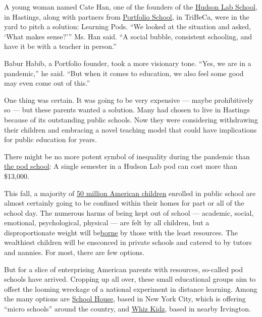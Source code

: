A young woman named Cate Han, one of the founders of the
\href{https://www.hudsonlabschool.com/}{Hudson Lab School}, in Hastings,
along with partners from
\href{https://www.portfolio-school.com/}{Portfolio School}, in TriBeCa,
were in the yard to pitch a solution: Learning Pods. ``We looked at the
situation and asked, `What makes sense?''' Ms. Han said. ``A social
bubble, consistent schooling, and have it be with a teacher in person.''

Babur Habib, a Portfolio founder, took a more visionary tone. ``Yes, we
are in a pandemic,'' he said. ``But when it comes to education, we also
feel some good may even come out of this.''

One thing was certain. It was going to be very expensive --- maybe
prohibitively so --- but these parents wanted a solution. Many had
chosen to live in Hastings because of its outstanding public schools.
Now they were considering withdrawing their children and embracing a
novel teaching model that could have implications for public education
for years.

There might be no more potent symbol of inequality during the pandemic
than
\href{https://www.nytimes3xbfgragh.onion/2020/07/22/parenting/school-pods-coronavirus.html}{the
pod school}: A single semester in a Hudson Lab pod can cost more than
\$13,000.

This fall, a majority of
\href{https://nces.ed.gov/programs/digest/d18/tables/dt18_203.10.asp}{50
million American children} enrolled in public school are almost
certainly going to be confined within their homes for part or all of the
school day. The numerous harms of being kept out of school --- academic,
social, emotional, psychological, physical --- are felt by all children,
but a disproportionate weight will
be\href{https://www.nytimes3xbfgragh.onion/2020/06/05/us/coronavirus-education-lost-learning.html}{borne}
by those with the least resources. The wealthiest children will be
ensconced in private schools and catered to by tutors and nannies. For
most, there are few options.

But for a slice of enterprising American parents with resources,
so-called pod schools have arrived. Cropping up all over, these small
educational groups aim to offset the looming wreckage of a national
experiment in distance learning. Among the many options are
\href{https://www.getschoolhouse.com/}{School House}, based in New York
City, which is offering ``micro schools'' around the country, and
\href{https://www.whizkidztutoring.com/wk-pods}{Whiz Kidz}, based in
nearby Irvington.

